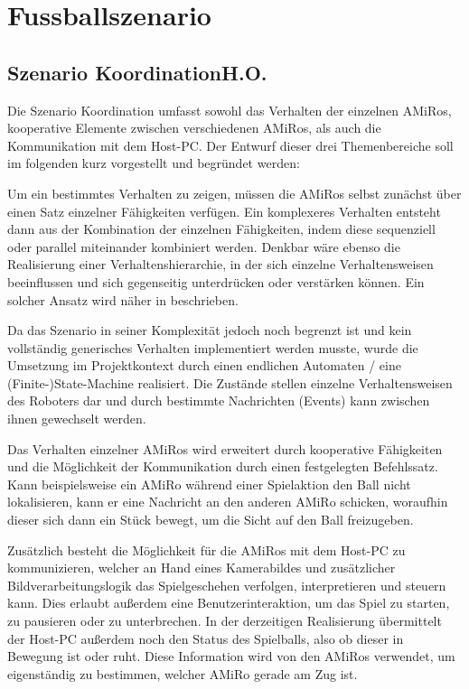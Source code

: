 \chapter{Fussballszenario} \label{kap:Fussballszenario} %

\section[Szenario Koordination]{Szenario Koordination\hfill {\normalsize H.O.}} \label{sec:szenario_koordination}

Die Szenario Koordination umfasst sowohl das Verhalten der einzelnen AMiRos, kooperative Elemente zwischen verschiedenen AMiRos, als auch die Kommunikation mit dem Host-PC. Der Entwurf dieser drei Themenbereiche soll im folgenden kurz vorgestellt und begründet werden:

Um ein bestimmtes Verhalten zu zeigen, müssen die AMiRos selbst zunächst über einen Satz einzelner Fähigkeiten verfügen. Ein komplexeres Verhalten entsteht dann aus der Kombination der einzelnen Fähigkeiten, indem diese sequenziell oder parallel miteinander kombiniert werden. Denkbar wäre ebenso die Realisierung einer Verhaltenshierarchie, in der sich einzelne Verhaltensweisen beeinflussen und sich gegenseitig unterdrücken oder verstärken können. Ein solcher Ansatz wird näher in \cite{Brooks:1986} beschrieben.

Da das Szenario in seiner Komplexität jedoch noch begrenzt ist und kein vollständig generisches Verhalten implementiert werden musste, wurde die Umsetzung im Projektkontext durch einen endlichen Automaten / eine (Finite-)State-Machine realisiert. Die Zustände stellen einzelne Verhaltensweisen des Roboters dar und durch bestimmte Nachrichten (Events) kann zwischen ihnen gewechselt werden.

Das Verhalten einzelner AMiRos wird erweitert durch kooperative Fähigkeiten und die Möglichkeit der Kommunikation durch einen festgelegten Befehlssatz. Kann beispielsweise ein AMiRo während einer Spielaktion den Ball nicht lokalisieren, kann er eine Nachricht an den anderen AMiRo schicken, woraufhin dieser sich dann ein Stück bewegt, um die Sicht auf den Ball freizugeben.

Zusätzlich besteht die Möglichkeit für die AMiRos mit dem Host-PC zu kommunizieren, welcher an Hand eines Kamerabildes und zusätzlicher Bildverarbeitungslogik das Spielgeschehen verfolgen, interpretieren und steuern kann. Dies erlaubt außerdem eine Benutzerinteraktion, um das Spiel zu starten, zu pausieren oder zu unterbrechen. In der derzeitigen Realisierung übermittelt der Host-PC außerdem noch den Status des Spielballs, also ob dieser in Bewegung ist oder ruht. Diese Information wird von den AMiRos verwendet, um eigenständig zu bestimmen, welcher AMiRo gerade am Zug ist.


